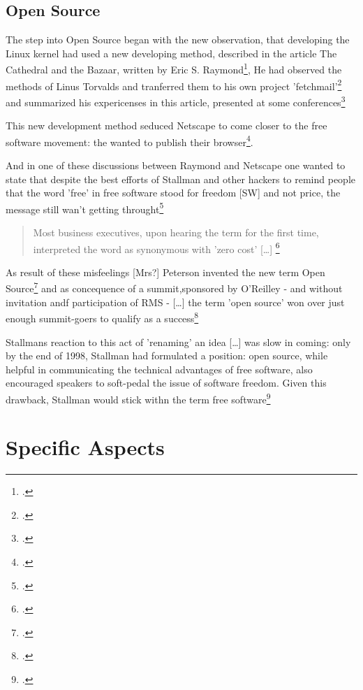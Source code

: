\documentclass[DIV=calc,BCOR=5mm,11pt,headings=small,oneside,abstract=true, toc=bib]{scrartcl}
\begin{document}
\subsection{Open Source}

The step into Open Source began with the new observation, that developing the
Linux kernel had used a new developing method, described in the article
\glqq{}The Cathedral and the Bazaar\grqq{}, written by Eric S.
Raymond\footcite[cf][159]{Williams2002a}, He had observed the methods of Linus
Torvalds and tranferred them to his own project
'fetchmail'\footcite[cf][158]{Williams2002a} and summarized his expericenses in
this article, presented at some conferences\footcite[cf][159]{Williams2002a}

This new development method seduced Netscape to come closer to the free software
movement: the wanted to publish their browser\footcite[cf][161]{Williams2002a}.

And in one of these discussions between Raymond and Netscape one wanted to state
that \glqq{}despite the best efforts of Stallman and other hackers to
remind people that the word 'free' in free software stood for freedom
[SW] and not price, the message still wan't getting
throught\grqq{}\footcite[cf][161f]{Williams2002a}

\begin{quote}
\glqq{}Most business executives, upon hearing the term for the first time,
interpreted the word as synonymous with 'zero cost' [\ldots]
\grqq{}\footcite[][162]{Williams2002a}
\end{quote}

As result of these misfeelings  [Mrs?] Peterson invented the new term
\glqq{}Open Source\grqq{}\footcite[cf][162]{Williams2002a} and as concequence of
a summit,sponsored by O'Reilley - and without invitation andf participation of
RMS - \glqq{}[\ldots] the term 'open source' won over just enough
summit-goers to qualify as a success\grqq{}\footcite[cf][162f]{Williams2002a}

Stallmans reaction to this act of 'renaming' an idea \glqq{}[\ldots] was
slow in coming\grqq{}: only \glqq{}by the end of 1998, Stallman had
formulated a position: open source, while helpful in communicating the
technical advantages of free software, also encouraged speakers to
soft-pedal the issue of software freedom. Given this drawback, Stallman
would stick withn the term free
software\grqq{}\footcite[cf][165]{Williams2002a}
\section{Specific Aspects}
\end{document}
